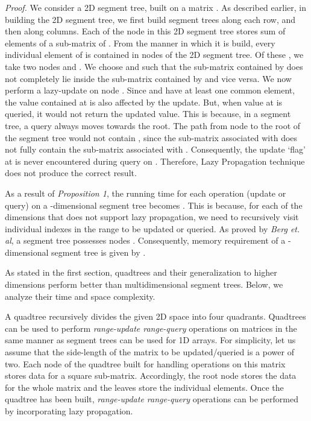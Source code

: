 \documentclass[a4paper]{article}
\begin{document}
\vspace{1 mm}
\noindent
\textit{Proof.}
We consider a 2D segment tree, built on a matrix . As described earlier, in building the 2D segment tree, we first build segment trees along each row, and then along columns. Each of the node in this 2D segment tree stores sum of elements of a sub-matrix of . From the manner in which it is build, every individual element  of  is contained in  nodes of the 2D segment tree. Of these , we take two nodes  and . We choose  and  such that the sub-matrix contained by  does not completely lie inside the sub-matrix contained by  and vice versa. We now perform a lazy-update on node . Since  and  have at least one common element, the value contained at  is also affected by the update. But, when value at  is queried, it would not return the updated value. This is because, in a segment tree, a query always moves towards the root. The path from node  to the root of the segment tree would not contain , since the sub-matrix associated with  does not fully contain the sub-matrix associated with . Consequently, the update `flag' at  is never encountered during query on . Therefore, Lazy Propagation technique does not produce the correct result.

\vspace{2 mm}
As a result of \textit{Proposition 1}, the running time for each operation (update or query) on a -dimensional segment tree becomes . This is because, for each of the  dimensions that does not support lazy propagation, we need to recursively visit individual indexes in the range to be updated or queried. As proved by \textit{Berg et. al}, a segment tree possesses  nodes \cite[p. 226-227]{ST}. Consequently, memory requirement of a -dimensional segment tree is given by .

\vspace{2 mm}
As stated in the first section, quadtrees and their generalization to higher dimensions perform better than multidimensional segment trees. Below, we analyze their time and space complexity.

\vspace{2 mm}
A quadtree\cite{QT1} recursively divides the given 2D space into four quadrants. Quadtrees can be used to perform \textit{range-update range-query} operations on matrices in the same manner as segment trees can be used for 1D arrays. For simplicity, let us assume that the side-length of the matrix to be updated/queried is a power of two. Each node of the quadtree built for handling operations on this matrix stores data for a square sub-matrix.\cite{QT3} Accordingly, the root node stores the data for the whole matrix and the leaves store the individual elements. Once the quadtree has been built, \textit{range-update range-query} operations can be performed by incorporating lazy propagation.
\end{document}
